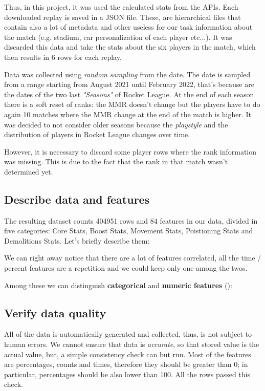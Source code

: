 Thus, in this project, it was used the calculated stats from the APIs. Each downloaded replay is saved in a JSON file. These, are hierarchical files that contain also a lot of metadata and other useless for our task information about the match (e.g. stadium, car personalization of each player etc...). It was discarded this data and take the stats about the six players in the match, which then results in 6 rows for each replay.

Data was collected using \textit{random sampling} from the date. The date is sampled from a range starting from August 2021 until February 2022, that's because are the dates of the two last \textit{"Seasons"} of Rocket League. At the end of each season there is a soft reset of ranks: the MMR doesn't change but the players have to do again 10 matches where the MMR change at the end of the match is higher.
It was decided to not consider older seasons because the \textit{playstyle} and the distribution of players in Rocket League changes over time.

However, it is necessary to discard some player rows where the rank information was missing. This is due to the fact that the rank in that match wasn't determined yet.

\subsection{Describe data and features}

The resulting dataset counts 404951 rows and 84 features in our data, divided in five categories: Core Stats, Boost Stats, Movement Stats, Poistioning Stats and Demolitions Stats. Let's briefly describe them:



We can right away notice that there are a lot of features correlated, all the time / percent features are a repetition and we could keep only one among the twos.

Among these we can distinguish \textbf{categorical} and \textbf{numeric features} ():



\subsection{Verify data quality}

All of the data is automatically generated and collected, thus, is not subject to human errors.
We cannot ensure that data is \textit{accurate}, so that stored value is the actual value, but, a simple consistency check can but run.
Most of the features are percentages, counts and times, therefore they should be greater than 0; in particular, percentages should be also lower than 100. All the rows passed this check.

